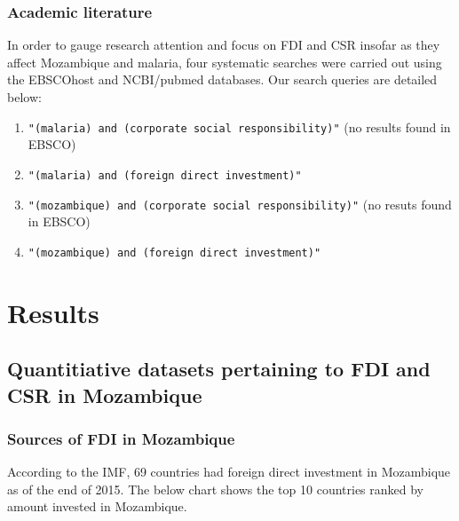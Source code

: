 \documentclass[]{elsarticle} %
\providecommand{\tightlist}{%
  \setlength{\itemsep}{0pt}\setlength{\parskip}{0pt}}
\begin{document}
\subsubsection{Academic literature}\label{academic-literature}

In order to gauge research attention and focus on FDI and CSR insofar as
they affect Mozambique and malaria, four systematic searches were
carried out using the EBSCOhost and NCBI/pubmed databases. Our search
queries are detailed below:

\begin{enumerate}
\def\labelenumi{\arabic{enumi}.}
\tightlist
\item
  \texttt{"(malaria)\ and\ (corporate\ social\ responsibility)"} (no
  results found in EBSCO)
\item
  \texttt{"(malaria)\ and\ (foreign\ direct\ investment)"}
\item
  \texttt{"(mozambique)\ and\ (corporate\ social\ responsibility)"} (no
  resuts found in EBSCO)
\item
  \texttt{"(mozambique)\ and\ (foreign\ direct\ investment)"}
\end{enumerate}

\section{Results}\label{results}

\subsection{Quantitiative datasets pertaining to FDI and CSR in
Mozambique}\label{quantitiative-datasets-pertaining-to-fdi-and-csr-in-mozambique}

\subsubsection{Sources of FDI in
Mozambique}\label{sources-of-fdi-in-mozambique}

According to the IMF, 69 countries had foreign direct investment in
Mozambique as of the end of 2015. The below chart shows the top 10
countries ranked by amount invested in Mozambique.
\end{document}
